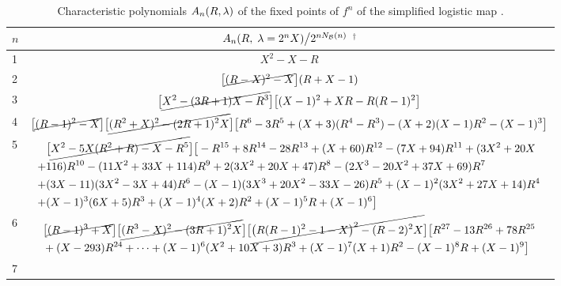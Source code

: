 \documentclass[preprint]{revtex4-1}
\begin{document}
\begin{table}[h]\footnotesize
  \caption{
  Characteristic polynomials $A_n(R, \lambda)$ of
  the fixed points of $f^n$ of
  the simplified logistic map .
  }
\begin{center}
\begin{tabular}{lc}
\hline
  $n$
& $A_n(R, \; \lambda = 2^n X)
  \big\slash
   2^{n N_\mathcal B(n)}$ $^\dagger$
\\
\hline
1
&
$X^2-X-R$
\\
2
&
  $
  \big[ \cancel{(R-X)^2 - X}\big]
  (R + X - 1)
  $
\\
3
&
$\begin{aligned}
\big[\cancel{
  X^2-(3R+1)X-R^3
}\big]
  \big[
  (X-1)^2
 + X R
 - R(R-1)^2
  \big]
\end{aligned}$
\\
4
&
$\begin{aligned}
\big[ \cancel{
  (R-1)^2 - X
} \big]
\big[ \cancel{
(R^2+X)^2 -(2R+1)^2 X
} \big]
\big[
  R^6-3 R^5+(X+3) (R^4 - R^3) -(X+2)(X-1) R^2 - (X-1)^3
\big]
\end{aligned}$
\\
5
&
\begin{minipage}{.97\linewidth}
\vspace*{2mm}
$\begin{aligned}
&\big[ \cancel{
  X^2-5 X (R^2+R)-X - R^5
} \big]
\big[
-R^{15}+8 R^{14}-28 R^{13}+(X+60) R^{12}-(7 X+94) R^{11}
+(3 X^2 +20 X
\\
+&116) R^{10}
-(11 X^2+33 X+114) R^9
+2(3 X^2+20 X+47) R^8
-(2 X^3-20 X^2+37 X+69) R^7 \\
+&(3 X-11)(3X^2-3X+44) R^6
-(X-1) (3 X^3+20 X^2-33 X-26) R^5
+(X-1)^2 (3 X^2+27 X+14) R^4 \\
+&(X-1)^3 (6 X+5) R^3
+(X-1)^4 (X+2) R^2+(X-1)^5 R+(X-1)^6
\big]
\end{aligned}$
\vspace{1mm}
\end{minipage}
\\
6
&
$\begin{aligned}
&\big[\cancel {
  (R-1)^3 + X
}\big]
\big[\cancel {
 (R^3 - X)^2 - (3R+1)^2 X
}\big]
\big[\cancel {
\big(R(R-1)^2-1-X\big)^2-(R-2)^2 X
}\big]
\big[
R^{27}-13 R^{26}+78 R^{25}\\
&+(X-293) R^{24}
+\dots
+(X-1)^6 (X^2+10 X+3) R^3
+(X-1)^7 (X+1) R^2-(X-1)^8 R+(X-1)^9
\big]
\end{aligned}$
\\
7
&
\begin{minipage}{.97\linewidth}

\end{minipage}
\end{tabular}
\end{center}
\end{table}
\end{document}

